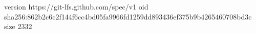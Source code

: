 version https://git-lfs.github.com/spec/v1
oid sha256:862b2c6c2f144f6cc4bd05fa9966fd1259dd893436ef375b9b4265460708bd3c
size 2332
